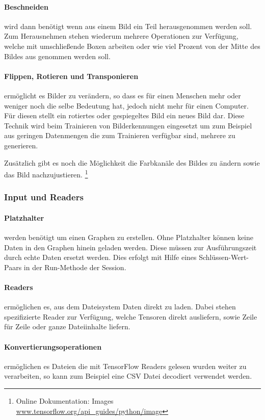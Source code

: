 \paragraph{Beschneiden} wird dann benötigt wenn aus einem Bild ein Teil herausgenommen werden soll. 
Zum Herausnehmen stehen wiederum mehrere Operationen zur Verfügung, welche mit umschließende Boxen arbeiten oder wie viel Prozent von der Mitte des Bildes aus genommen werden soll.

\paragraph{Flippen, Rotieren und Transponieren} ermöglicht es Bilder zu verändern, so dass es für einen Menschen mehr oder weniger noch die selbe Bedeutung hat, jedoch nicht mehr für einen Computer. 
Für diesen stellt ein rotiertes oder gespiegeltes Bild ein neues Bild dar. 
Diese Technik wird beim Trainieren von Bilderkennungen eingesetzt um zum Beispiel aus geringen Datenmengen die zum Trainieren verfügbar sind, mehrere zu generieren.
\phantom \newline

\noindent
Zusätzlich gibt es noch die Möglichkeit die Farbkanäle des Bildes zu ändern sowie das Bild nachzujustieren. 
\footnote{Online Dokumentation: Images \url{www.tensorflow.org/api_guides/python/image}}

\subsubsection{Input und Readers}

\paragraph{Platzhalter} werden benötigt um einen Graphen zu erstellen. 
Ohne Platzhalter können keine Daten in den Graphen hinein geladen werden. 
Diese müssen zur Ausführungszeit durch echte Daten ersetzt werden. 
Dies erfolgt mit Hilfe eines Schlüssen-Wert-Paars in der Run-Methode der Session. 

\paragraph{Readers} ermöglichen es, aus dem Dateisystem Daten direkt zu laden. 
Dabei stehen spezifizierte Reader zur Verfügung, welche Tensoren direkt ausliefern, sowie Zeile für Zeile  oder ganze Dateiinhalte liefern. 

\paragraph{Konvertierungsoperationen} ermöglichen es Dateien die mit TensorFlow Readers gelesen wurden weiter zu verarbeiten, so kann zum Beispiel eine CSV Datei decodiert verwendet werden.
\phantom \newline

